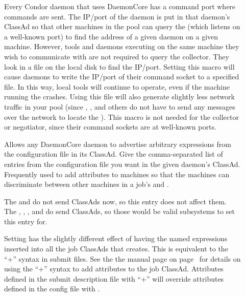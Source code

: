 \begin{description}
\item[]
  \label{param:SubsysAddressFile} Every Condor daemon that uses
  DaemonCore has a command port where commands are sent.  The
  IP/port of the daemon is put in that daemon's ClassAd so that other
  machines in the pool can query the  (which listens
  on a well-known port) to find the address of a given daemon on a
  given machine.  However, tools and daemons executing on the same
  machine they wish to communicate with are not required to query the
  collector. They look in a file on the local disk to find
  the IP/port.  Setting this macro will cause daemons to write the
  IP/port of their command socket to a specified file.  In this way,
  local tools will continue to operate, even if the machine running
  the  crashes.  Using this file will also generate
  slightly less network traffic in your pool (since ,
  , and others do not have to send any messages over the network to
  locate the ).  This macro is not needed
  for the collector or negotiator, since their command sockets are at
  well-known ports.  
  
\item[] \label{param:SubsysExprs}
  Allows any DaemonCore daemon to advertise arbitrary
  expressions from the configuration file in its ClassAd.  Give the
  comma-separated list of entries from the configuration file you want in the
  given daemon's ClassAd.
  Frequently used to add attributes to machines so that the
  machines can discriminate between other machines in a job's 
    and .
  
  \Note The  and  do not send
  ClassAds now, so this entry does not affect them.  The
  , , , and
   do send ClassAds, so those would be valid
  subsystems to set this entry for.
  
  Setting  has the slightly
  different effect of having the named expressions inserted into all
  the job ClassAds that  creates.  This is equivalent
  to the ``+'' syntax in submit files.  See the
  the  manual page
  on page~\pageref{sec:man-condor-submit} for details on using the ``+''
  syntax to add attributes to the job ClassAd.
  Attributes defined in the submit description file with ``+'' will
  override attributes defined in the config file with
  . 


\end{description}
